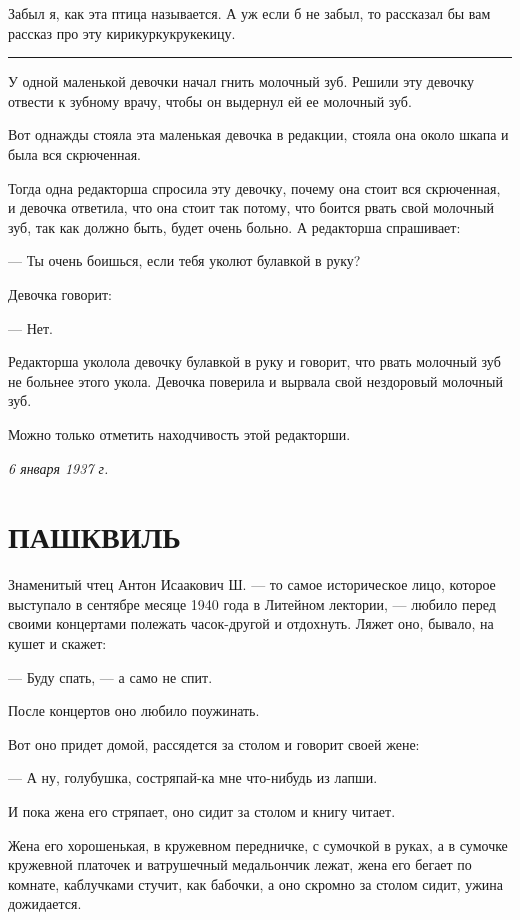 \documentclass[a4paper,12pt]{article}
\begin{document}
Забыл я, как эта птица называется. А уж если б не забыл, то рассказал бы вам рассказ про эту кирикуркукрукекицу.

\vspace{0.5cm}
\hrule
\vspace{0.5cm}

У одной маленькой девочки начал гнить молочный зуб. Решили эту девочку отвести к зубному врачу, чтобы он выдернул ей ее молочный зуб.

Вот однажды стояла эта маленькая девочка в редакции, стояла она около шкапа и была вся скрюченная.

Тогда одна редакторша спросила эту девочку, почему она стоит вся скрюченная, и девочка ответила, что она стоит так потому, что боится рвать свой молочный зуб, так как должно быть, будет очень больно. А редакторша спрашивает:

— Ты очень боишься, если тебя уколют булавкой в руку?

Девочка говорит:

— Нет.

Редакторша уколола девочку булавкой в руку и говорит, что рвать молочный зуб не больнее этого укола. Девочка поверила и вырвала свой нездоровый молочный зуб.

Можно только отметить находчивость этой редакторши.

\begin{flushright}
\textit{6 января 1937 г.}
\end{flushright}

\newpage

\section*{ПАШКВИЛЬ}

Знаменитый чтец Антон Исаакович Ш. — то самое историческое лицо, которое выступало в сентябре месяце 1940 года в Литейном лектории, — любило перед своими концертами полежать часок-другой и отдохнуть. Ляжет оно, бывало, на кушет и скажет:

— Буду спать, — а само не спит.

После концертов оно любило поужинать.

Вот оно придет домой, рассядется за столом и говорит своей жене:

— А ну, голубушка, состряпай-ка мне что-нибудь из лапши.

И пока жена его стряпает, оно сидит за столом и книгу читает.

Жена его хорошенькая, в кружевном передничке, с сумочкой в руках, а в сумочке кружевной платочек и ватрушечный медальончик лежат, жена его бегает по комнате, каблучками стучит, как бабочки, а оно скромно за столом сидит, ужина дожидается.
\end{document}
